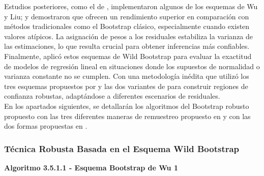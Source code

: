 Estudios posteriores, como el de \textcite{rana-2012}, implementaron algunos de los esquemas de Wu y Liu; y demostraron que ofrecen un rendimiento superior en comparación con métodos tradicionales como el Bootstrap clásico, especialmente cuando existen valores atípicos. La asignación de pesos a los residuales estabiliza la varianza de las estimaciones, lo que resulta crucial para obtener inferencias más confiables.\\


Finalmente, \textcite{zacarias-2023} aplicó estos esquemas de Wild Bootstrap para evaluar la exactitud de modelos de regresión lineal en situaciones donde los supuestos de normalidad o varianza constante no se cumplen. Con una metodología inédita que utilizó los tres esquemas propuestos por \textcite{wu-1986} y las dos variantes de \textcite{liu-1988} para construir regiones de confianza robustas, adaptándose a diferentes escenarios de residuales.\\


En los apartados siguientes, se detallarán los algoritmos del Bootstrap robusto propuesto \textcite{rana-2012} con las tres diferentes maneras de remuestreo propuesto en \textcite{wu-1986} y con las dos formas
propuestas en \textcite{liu-1988}.



\subsubsection{Técnica Robusta Basada en el Esquema Wild Bootstrap}

\textbf{Algoritmo 3.5.1.1 - Esquema Bootstrap de Wu 1}

